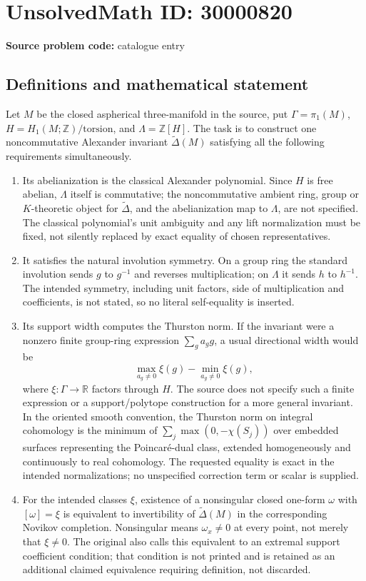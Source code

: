 \documentclass[11pt]{article}
\newcommand{\Z}{\mathbb{Z}}
\newcommand{\R}{\mathbb{R}}
\begin{document}
\section*{UnsolvedMath ID: 30000820}
\textbf{Source problem code:} catalogue entry
\subsection{Definitions and mathematical statement}
Let \(M\) be the closed aspherical three-manifold in the source, put \(\Gamma=\pi_1(M)\), \(H=H_1(M;\Z)/\mathrm{torsion}\), and \(\Lambda=\Z[H]\). The task is to construct one noncommutative Alexander invariant \(\widetilde\Delta(M)\) satisfying all the following requirements simultaneously.
\begin{enumerate}
\item Its abelianization is the classical Alexander polynomial. Since \(H\) is free abelian, \(\Lambda\) itself is commutative; the noncommutative ambient ring, group or \(K\)-theoretic object for \(\widetilde\Delta\), and the abelianization map to \(\Lambda\), are not specified. The classical polynomial's unit ambiguity and any lift normalization must be fixed, not silently replaced by exact equality of chosen representatives.
\item It satisfies the natural involution symmetry. On a group ring the standard involution sends \(g\) to \(g^{-1}\) and reverses multiplication; on \(\Lambda\) it sends \(h\) to \(h^{-1}\). The intended symmetry, including unit factors, side of multiplication and coefficients, is not stated, so no literal self-equality is inserted.
\item Its support width computes the Thurston norm. If the invariant were a nonzero finite group-ring expression \(\sum_g a_g g\), a usual directional width would be
\[
 \max_{a_g\ne0}\xi(g)-\min_{a_g\ne0}\xi(g),
\]
where \(\xi:\Gamma\to\R\) factors through \(H\). The source does not specify such a finite expression or a support/polytope construction for a more general invariant. In the oriented smooth convention, the Thurston norm on integral cohomology is the minimum of \(\sum_j\max(0,-\chi(S_j))\) over embedded surfaces representing the Poincar\'e-dual class, extended homogeneously and continuously to real cohomology. The requested equality is exact in the intended normalizations; no unspecified correction term or scalar is supplied.
\item For the intended classes \(\xi\), existence of a nonsingular closed one-form \(\omega\) with \([\omega]=\xi\) is equivalent to invertibility of \(\widetilde\Delta(M)\) in the corresponding Novikov completion. Nonsingular means \(\omega_x\ne0\) at every point, not merely that \(\xi\ne0\). The original also calls this equivalent to an extremal support coefficient condition; that condition is not printed and is retained as an additional claimed equivalence requiring definition, not discarded.
\end{enumerate}
\end{document}

